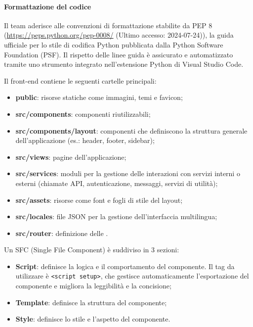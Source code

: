 \paragraph*{Formattazione del codice}
\par Il team aderisce alle convenzioni di formattazione stabilite da PEP 8 (\href{https://peps.python.org/pep-0008/}{https://peps.python.org/pep-0008/} (Ultimo accesso: 2024-07-24)), la guida ufficiale per lo stile di codifica Python pubblicata dalla Python Software Foundation (PSF). Il rispetto delle linee guida è assicurato e automatizzato tramite uno strumento integrato nell'estensione Python di Visual Studio Code.

\par Il front-end contiene le seguenti cartelle principali:
\begin{itemize}
  \item \textbf{public}: risorse statiche come immagini, temi e favicon;
  \item \textbf{src/components}: componenti riutilizzabili;
  \item \textbf{src/components/layout}: componenti che definiscono la struttura generale dell'applicazione (es.: header, footer, sidebar);
  \item \textbf{src/views}: pagine dell'applicazione;
  \item \textbf{src/services}: moduli per la gestione delle interazioni con servizi interni o esterni (chiamate API, autenticazione, messaggi, servizi di utilità);
  \item \textbf{src/assets}: risorse come font e fogli di stile del layout;
  \item \textbf{src/locales}: file JSON per la gestione dell'interfaccia multilingua;
  \item \textbf{src/router}: definizione delle .
\end{itemize}

\par Un SFC (Single File Component) è suddiviso in 3 sezioni:
\begin{itemize}
  \item \textbf{Script}: definisce la logica e il comportamento del componente. Il tag da utilizzare è \verb|<script setup>|, che gestisce automaticamente l'esportazione del componente e migliora la leggibilità e la concisione;
  \item \textbf{Template}: definisce la struttura del componente;
  \item \textbf{Style}: definisce lo stile e l'aspetto del componente.
\end{itemize}

